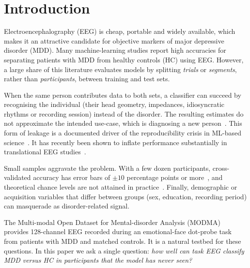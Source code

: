 \section{Introduction}

Electroencephalography (EEG) is cheap, portable and widely available, which makes it an attractive candidate for
objective markers of major depressive disorder (MDD). Many machine-learning studies report high accuracies for
separating patients with MDD from healthy controls (HC) using EEG. However, a large share of this literature evaluates
models by splitting \emph{trials} or \emph{segments}, rather than \emph{participants}, between training and test sets.

When the same person contributes data to both sets, a classifier can succeed by recognising the individual (their
head geometry, impedances, idiosyncratic rhythms or recording session) instead of the disorder. The resulting estimates
do not approximate the intended use-case, which is diagnosing a new person~\cite{saeb2017need}. This form of leakage
is a documented driver of the reproducibility crisis in ML-based science~\cite{kapoor2023leakage}. It has recently been
shown to inflate performance substantially in translational EEG studies~\cite{brookshire2024leakage}.

Small samples aggravate the problem. With a few dozen participants, cross-validated accuracy has error bars of
$\pm10$ percentage points or more~\cite{varoquaux2018cross}, and theoretical chance levels are not attained in
practice~\cite{combrisson2015exceeding}. Finally, demographic or acquisition variables that differ between groups
(sex, education, recording period) can masquerade as disorder-related signal.

The Multi-modal Open Dataset for Mental-disorder Analysis (MODMA)~\cite{cai2022modma} provides 128-channel EEG
recorded during an emotional-face dot-probe task~\cite{macleod1986attentional} from patients with MDD and matched
controls. It is a natural testbed for these questions. In this paper we ask a single question:
\emph{how well can task EEG classify MDD versus HC in participants that the model has never seen?}

